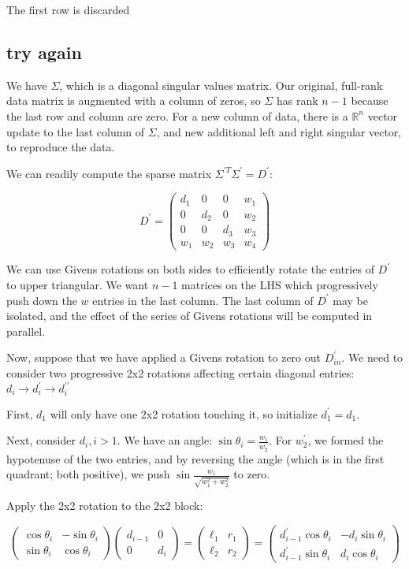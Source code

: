 \documentclass{article}
\begin{document}
The first row is discarded

\subsection*{try again}

We have $\Sigma$, which is a diagonal singular values matrix. Our original, full-rank data matrix is augmented with a column of zeros, so $\Sigma$ has rank $n-1$ because the last row and column are zero. For a new column of data, there is a $\mathbb{R}^n$ vector update to the last column of $\Sigma$, and new additional left and right singular vector, to reproduce the data.

We can readily compute the sparse matrix $\Sigma^{\prime T} \Sigma^\prime = D^\prime$:

$$
D^\prime =
\left(\begin{matrix}
d_1 & 0 & 0 & w_1 \\
0 & d_2 & 0 & w_2 \\
0 & 0 & d_3 & w_3 \\
w_1 & w_2 & w_3 & w_4
\end{matrix}\right)
$$

We can use Givens rotations on both sides to efficiently rotate the entries of $D^\prime$ to upper triangular. We want $n-1$ matrices on the LHS which progressively push down the $w$ entries in the last column. The last column of $D^\prime$ may be isolated, and the effect of the series of Givens rotations will be computed in parallel.

Now, suppose that we have applied a Givens rotation to zero out $D^\prime_{in}$. We need to consider two progressive 2x2 rotations affecting certain diagonal entries: $d_i \to d_i^\prime \to d_i^{\prime\prime}$

First, $d_1$ will only have one 2x2 rotation touching it, so initialize $d_1^\prime = d_1$.

Next, consider $d_i, i > 1$. We have an angle: $\sin \theta_i = \frac{w_1}{w_2^\prime}$. For $w_2^\prime$, we formed the hypotenuse of the two entries, and by reversing the angle (which is in the first quadrant; both positive), we push $\sin \frac{w_1}{\sqrt{w_1^2+w_2^2}}$ to zero.

Apply the 2x2 rotation to the 2x2 block:

$$
\left(
\begin{matrix}
\cos \theta_i & -\sin\theta_i \\
\sin\theta_i & \cos\theta_i
\end{matrix}
\right)
\left(\begin{matrix}
d_{i-1} & 0 \\
0 & d_i \end{matrix}\right)
=
\left(\begin{matrix}
	\ell_1 & r_1 \\ \ell_2 & r_2
\end{matrix}\right)
=
\left(\begin{matrix}
	d_{i-1}^\prime\cos\theta_i
	&
	-d_i \sin\theta_i
	\\
	d_{i-1}^\prime\sin\theta_i
	&
	d_i\cos\theta_i
\end{matrix}\right)
$$
\end{document}
